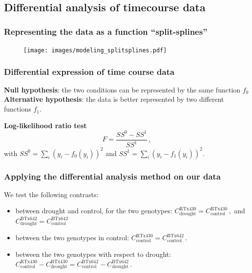 \documentclass[xcolor=dvipsnames]{beamer}
\begin{document}
\subsection{Differential analysis of timecourse data}

\begin{frame}
\frametitle{Representing the data as a function ``split-splines''}
\begin{figure}
\texttt{[image: images/modeling\_splitsplines.pdf]}
\end{figure}
\end{frame}

\begin{frame}
\frametitle{Differential expression of time course data}

\vspace{2em}
{\bf Null hypothesis}: the two conditions can be represented by the same
function $f_0$
\\
{\bf Alternative hypothesis}: the data is better represented by two different
functions $f_1$.

\vspace{2em}
{\bf Log-likelihood ratio test}
\begin{equation}
F = \frac{SS^0 - SS^1}{SS^1}\,,
\end{equation}
with $SS^0 = \sum_i (y_i - f_0(y_i))^2$  and $SS^1 = \sum_i (y_i - f_1(y_i))^2$.
\end{frame}

\begin{frame}
\frametitle{Applying the differential analysis method on our data}

We test the following contrasts:
\begin{itemize}[label=${\bullet}$]
\item between drought and control, for the two genotypes: $C_{\text{drought}}^{\text{RTx430}} =
C_{\text{control}}^{\text{RTx430}}\,,$ and
$C_{\text{drought}}^{\text{BTx642}} = C_{\text{control}}^{\text{BTx642}}$

\item between the two genotypes in control:
$C_{\text{control}}^{\text{RTx430}} =
C_{\text{control}}^{\text{BTx642}}\,.$
\item between the two genotypes with respect to drought:
$C_{\text{control}}^{\text{RTx430}} - C_{\text{drought}}^{\text{RTx430}} = 
C_{\text{control}}^{\text{BTx642}} - C_{\text{drought}}^{\text{BTx642}}\,.$
\end{itemize}

\end{frame}
\end{document}
